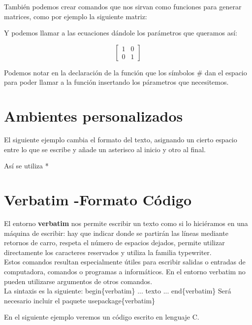 \documentclass{article}
\begin{document}
Tambi\'en podemos crear comandos que nos sirvan como funciones para generar 
matrices, como por ejemplo la siguiente matriz: 
\newcommand{\meq}[2]{
\begin{equation} 
\left[ 
\begin{array}{#1} 
#2
\end{array} 
\right] 
\end{equation} 
}

Y podemos llamar a las ecuaciones d\'andole los par\'ametros que queramos as\'i: 
\meq{cc}{1&0\\0&1} 
Podemos notar en la declaraci\'on de la funci\'on que los s\'imbolos \# dan el espacio para poder llamar a la funci\'on insertando los p\'arametros que necesitemos. 


\section{Ambientes personalizados} 
El siguiente ejemplo cambia el formato del texto, asignando un cierto espacio entre lo que se 
escribe y a\~nade un asterisco al inicio y otro al final. 
\newenvironment{titulito}{*\hspace{\stretch{1}}}{*}

\medskip 
\begin{titulito}
As\'i se utiliza 
\end{titulito}


\section{Verbatim -Formato C\'odigo} 
El entorno \textbf{verbatim} nos permite escribir un texto como si lo hici\'eramos en una m\'aquina de escribir: hay que indicar donde se partir\'an las l\'ineas mediante retornos de carro, respeta el n\'umero de espacios dejados, permite utilizar directamente los caracteres reservados y utiliza la familia typewriter.\\ 
Estos comandos resultan especialmente \'utiles para escribir salidas o entradas de computadora, comandos o programas a inform\'aticos. En el entorno verbatim no pueden utilizarse argumentos de otros comandos.\\ 
La sintaxis es la siguiente: 
\dinv begin\{verbatim\} ... {texto} ... \dinv end\{verbatim\} 
\medskip 
Ser\'a necesario incluir el paquete \dinv usepackage\{verbatim\}

En el siguiente ejemplo veremos un c\'odigo escrito en lenguaje C. 
\end{document}
